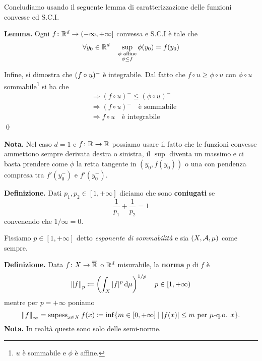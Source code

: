Concludiamo usando il seguente lemma di caratterizzazione delle funzioni convesse ed S.C.I.

\textbf{Lemma.}
Ogni $f \colon \mathbb R^d \to (-\infty, +\infty]$ convessa e S.C.I è tale che
$$
\forall y_0 \in \mathbb R^d \quad \sup_{\substack{\phi \text{ affine} \\ \phi \leq f}} \phi(y_0) = f(y_0)
$$

Infine, si dimostra che $(f \circ u)^-$ è integrabile. 
Dal fatto che $f \circ u \geq \phi \circ u$ con $\phi \circ u$ sommabile\footnote{$u$ è sommabile e $\phi$ è affine.} si ha che
\begin{align*}
	& \Longrightarrow \left( f \circ u \right)^- \leq \left( \phi \circ u \right)^- \\
	& \Longrightarrow \left( f \circ u \right)^- \quad \text{è sommabile} \\
	& \Longrightarrow f \circ u \quad \text{è integrabile}
\end{align*}
\qed

\textbf{Nota.} Nel caso $d = 1$ e $f \colon \mathbb R \to \mathbb R$ possiamo usare il fatto che le funzioni convesse ammettono sempre derivata destra o sinistra, il $\sup$ diventa un massimo e ci basta prendere come $\phi$ la retta tangente in $(y_0, f(y_0))$ o una con pendenza compresa tra $f'(y_0^-)$ e $f'(y_0^+)$.

\textbf{Definizione.} Dati $p_1, p_2 \in [1, +\infty]$ diciamo che sono \textbf{coniugati} se
$$
\frac{1}{p_1} + \frac{1}{p_2} = 1
$$
convenendo che $1/\infty = 0$.

Fissiamo $p \in [1, +\infty]$ detto \textit{esponente di sommabilità} e sia $(X, \mathcal{A}, \mu)$ come sempre.

\textbf{Definizione.} Data $f \colon X \to \overline {\mathbb R}$ o $\mathbb R^d$ misurabile, la \textbf{norma} $p$ di $f$ è
$$
	\left\lVert f \right\rVert_p \coloneqq \left( \int_X |f|^p \,\mathrm{d} \mu \right)^{1/p} \quad p \in [1, +\infty)
$$
mentre per $p = +\infty$ poniamo
$$
	\left\lVert f \right\rVert_\infty = \operatorname{supess}_{x \in X} f(x) \coloneqq \inf \{ m \in [0, +\infty] \mid |f(x)| \leq m \text{ per $\mu$-q.o. } x \}.
$$
\textbf{Nota.} In realtà queste sono solo delle semi-norme.

